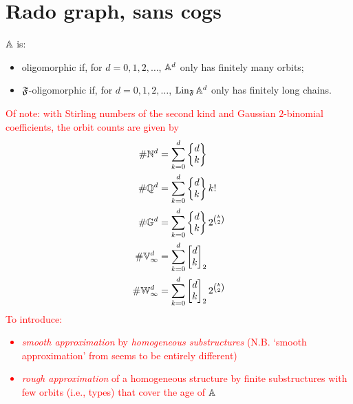 \section{Rado graph, sans cogs}

$\mathbb{A}$ is: 
\begin{itemize}
    \item oligomorphic if, for $d = 0, 1, 2, \ldots$, $\mathbb{A}^d$ only has finitely many orbits;
    \item $\mathfrak{F}$-oligomorphic if, for $d = 0, 1, 2, \ldots$, $\operatorname{Lin}_{\mathfrak{F}} \mathbb{A}^d$ only has finitely long chains.
\end{itemize}
\textcolor{red}{
Of note: with Stirling numbers of the second kind and Gaussian $2$-binomial coefficients,
the orbit counts are given by
\begin{align*}
    \# \mathbb{N}^d &= \sum_{k=0}^d \begin{Bmatrix} d \\ k \end{Bmatrix} \\
    \# \mathbb{Q}^d &= \sum_{k=0}^d \begin{Bmatrix} d \\ k \end{Bmatrix} k! \\
    \# \mathbb{G}^d &= \sum_{k=0}^d \begin{Bmatrix} d \\ k \end{Bmatrix} 2^{\binom{k}{2}} \\
    \# \mathbb{V}_\infty^d &= \sum_{k=0}^d \begin{bmatrix} d \\ k \end{bmatrix}_2 \\
    \# \mathbb{W}_\infty^d &= \sum_{k=0}^d \begin{bmatrix} d \\ k \end{bmatrix}_2 2^{\binom{k}{2}}
\end{align*}
To introduce: 
\begin{itemize}
    \item 
    \emph{smooth approximation} by \emph{homogeneous substructures} \cite{KLM89} (N.B. `smooth approximation' from \cite[Definition~4]{MP24} seems to be entirely different)
    \item 
    \emph{rough approximation} of a homogeneous structure by finite substructures with few orbits (i.e., types)
    that cover the age of $\mathbb{A}$
\end{itemize}}

